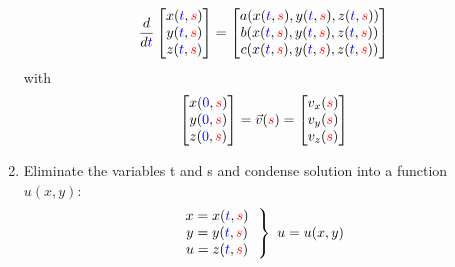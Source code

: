 \begin{enumerate}
{        \begin{align*}
            \frac{d}{d{\color{blue}t}}
            \begin{bmatrix}
                x({\color{blue}t}, {\color{red}s}) \\
                y({\color{blue}t}, {\color{red}s}) \\
                z({\color{blue}t}, {\color{red}s})
            \end{bmatrix}
            =
            \begin{bmatrix}
                a(x({\color{blue}t},{\color{red}s}), y({\color{blue}t},{\color{red}s}), z({\color{blue}t}, {\color{red}s})) \\
                b(x({\color{blue}t},{\color{red}s}), y({\color{blue}t},{\color{red}s}), z({\color{blue}t}, {\color{red}s})) \\
                c(x({\color{blue}t},{\color{red}s}), y({\color{blue}t},{\color{red}s}), z({\color{blue}t}, {\color{red}s}))
            \end{bmatrix}
        \end{align*}
        with
        \begin{align*}
            \begin{bmatrix}
                x({\color{blue}0}, {\color{red}s}) \\
                y({\color{blue}0}, {\color{red}s}) \\
                z({\color{blue}0}, {\color{red}s})
            \end{bmatrix}
            =
            \vec{v}({\color{red}s})
            =
            \begin{bmatrix}
                v_x({\color{red}s} ) \\
                v_y({\color{red}s})  \\
                v_z({\color{red}s})
            \end{bmatrix}
        \end{align*}
    }
    \item{
        Eliminate the variables {\color{blue}t} and {\color{red}s} and condense solution into a function $u(x, y)$:
        \begin{align*}
            \left.
            \begin{matrix}
                x=x({\color{blue}t},{\color{red}s}) \\
                y=y({\color{blue}t},{\color{red}s}) \\
                u=z({\color{blue}t},{\color{red}s})
            \end{matrix}
            \ \ \right\}
            \ u=u(x,y)
        \end{align*}
    }
\end{enumerate}
